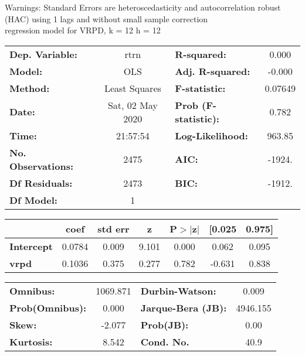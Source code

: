Warnings: \newline
 [1] Standard Errors are heteroscedasticity and autocorrelation robust (HAC) using 1 lags and without small sample correction\\ 

regression model for VRPD, k = 12 h = 12\begin{center}
\begin{tabular}{lclc}
\toprule
\textbf{Dep. Variable:}    &       rtrn       & \textbf{  R-squared:         } &     0.000   \\
\textbf{Model:}            &       OLS        & \textbf{  Adj. R-squared:    } &    -0.000   \\
\textbf{Method:}           &  Least Squares   & \textbf{  F-statistic:       } &   0.07649   \\
\textbf{Date:}             & Sat, 02 May 2020 & \textbf{  Prob (F-statistic):} &    0.782    \\
\textbf{Time:}             &     21:57:54     & \textbf{  Log-Likelihood:    } &    963.85   \\
\textbf{No. Observations:} &        2475      & \textbf{  AIC:               } &    -1924.   \\
\textbf{Df Residuals:}     &        2473      & \textbf{  BIC:               } &    -1912.   \\
\textbf{Df Model:}         &           1      & \textbf{                     } &             \\
\bottomrule
\end{tabular}
\begin{tabular}{lcccccc}
                   & \textbf{coef} & \textbf{std err} & \textbf{z} & \textbf{P$> |$z$|$} & \textbf{[0.025} & \textbf{0.975]}  \\
\midrule
\textbf{Intercept} &       0.0784  &        0.009     &     9.101  &         0.000        &        0.062    &        0.095     \\
\textbf{vrpd}      &       0.1036  &        0.375     &     0.277  &         0.782        &       -0.631    &        0.838     \\
\bottomrule
\end{tabular}
\begin{tabular}{lclc}
\textbf{Omnibus:}       & 1069.871 & \textbf{  Durbin-Watson:     } &    0.009  \\
\textbf{Prob(Omnibus):} &   0.000  & \textbf{  Jarque-Bera (JB):  } & 4946.155  \\
\textbf{Skew:}          &  -2.077  & \textbf{  Prob(JB):          } &     0.00  \\
\textbf{Kurtosis:}      &   8.542  & \textbf{  Cond. No.          } &     40.9  \\
\bottomrule
\end{tabular}
\end{center}

